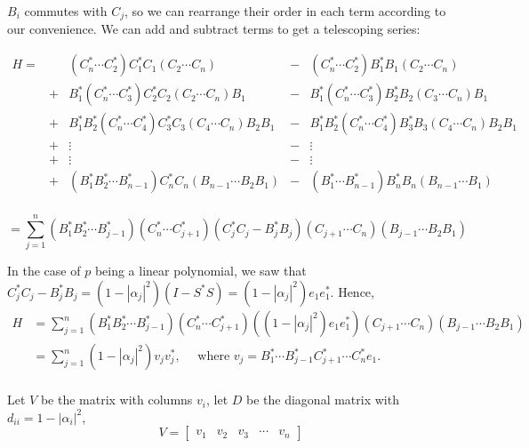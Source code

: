 \documentclass[twoside]{article}
\newcommand*\adj[1]{#1^*}
\newcommand*\abs[1]{\left \vert #1 \right\vert}
\theoremstyle{plain}
\theoremstyle{definition}
\theoremstyle{remark}
\begin{document}
\(B_i\) commutes with \(C_j\), so we can rearrange their order in each term according to our convenience. 
We can add and subtract terms to get a telescoping series:

\[\begin{array}{ccccc}
H = &   & (\adj{C_n} \cdots \adj{C_2}) \adj{C_1} C_1 ( C_2 \cdots C_n) & - & (\adj{C_n} \cdots \adj{C_2}) \adj{B_1} B_1 (C_2 \cdots C_n) \\
& + & \adj{B_1} (\adj{C_n} \cdots \adj{C_3}) \adj{C_2} C_2( C_2 \cdots C_n) B_1 & -& \adj{B_1}(\adj{C_n} \cdots \adj{C_3}) \adj{B_2} B_2(C_3 \cdots C_n) B_1 \\
&    + & \adj{B_1} \adj{B_2} (\adj{C_n} \cdots \adj{C_4})\adj{C_3} C_3( C_4 \cdots C_n) B_2 B_1& -& \adj{B_1} \adj{B_2}(\adj{C_n} \cdots \adj{C_4})\adj{B_3} B_3 (C_4 \cdots C_n) B_2 B_1 \\
& + & \vdots & -& \vdots  \\
& + & \vdots & -& \vdots  \\
& + & (\adj{B_1} \adj{B_2} \cdots \adj{B_{n-1}}) \adj{C_n} C_n  (B_{n-1} \cdots  B_2 B_1) & -& (\adj{B_1} \cdots \adj{B_{n-1}})\adj{B_n} B_n (B_{n-1} \cdots B_1) \\
\end{array}\]


\[= \sum_{j = 1} ^n (\adj{B_1} \adj{B_2} \cdots \adj{B_{j-1}})(\adj{C_{n}} \cdots \adj{C_{j+1}}) (\adj{C_j} C_j - \adj{B_j} B_j) (C_{j+1} \cdots C_n) (B_{j-1} \cdots B_2 B_1) \]


In the case of \(p\) being a linear polynomial, we saw that \(\adj{C_j} C_j - \adj{B_j} B_j  = (1 - \abs{\alpha_j}^2) (I - \adj{S} S)  = (1 - \abs{\alpha_j}^2) e_1 \adj{e_1}\). Hence, 
\begin{equation*}\begin{split}
H & = \sum_{j = 1} ^n (\adj{B_1} \adj{B_2} \cdots \adj{B_{j-1}})(\adj{C_{n}} \cdots \adj{C_{j+1}}) ((1-\abs{\alpha_j}^2) e_1 \adj{e_1}) (C_{j+1} \cdots C_n) (B_{j-1} \cdots B_2 B_1) \\
& =  \sum_{j=1} ^n (1-\abs{\alpha_j}^2) v_j \adj{v_j}, \quad \text{ where } v_j = \adj{B_1} \cdots \adj{B_{j-1}} \adj{C_{j+1}} \cdots \adj{C_n} e_1.\\
\end{split} \end{equation*}

Let \(V\) be the matrix with columns \(v_i\), let \(D\) be the diagonal matrix with \(d_{ii} = 1 - \abs{\alpha_i}^2\), 
\[V = \begin{bmatrix} v_1 & v_2 & v_3 & \cdots & v_n \end{bmatrix} \]
\end{document}
